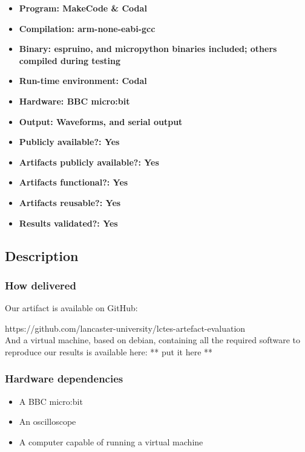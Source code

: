 {\small
\begin{itemize}
  \item {\bf Program: MakeCode \& Codal}
  \item {\bf Compilation: arm-none-eabi-gcc}
  \item {\bf Binary: espruino, and micropython binaries included; others compiled during testing}
  \item {\bf Run-time environment: Codal}
  \item {\bf Hardware: BBC micro:bit}
  \item {\bf Output: Waveforms, and serial output}
  \item {\bf Publicly available?: Yes}
\end{itemize}

\begin{itemize}
  \item {\bf Artifacts publicly available?: Yes}
  \item {\bf Artifacts functional?: Yes}
  \item {\bf Artifacts reusable?: Yes}
  \item {\bf Results validated?: Yes}
\end{itemize}

\subsection{Description}

\subsubsection{How delivered}

Our artifact is available on GitHub:

https://github.com/lancaster-university/lctes-artefact-evaluation\\And a virtual machine, based on debian, containing all the required software to reproduce our results is available here: ** put it here **

\subsubsection{Hardware dependencies}

\begin{itemize}
    \item A BBC micro:bit
    \item An oscilloscope
    \item A computer capable of running a virtual machine
\end{itemize}

}
